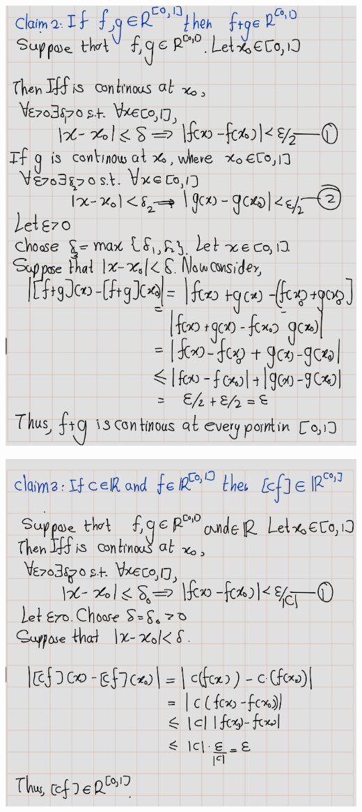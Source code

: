 \documentclass[
]{book}
\theoremstyle{definition}
\theoremstyle{definition}
\theoremstyle{definition}
\theoremstyle{definition}
\theoremstyle{remark}
\begin{document}
\includegraphics{fig/Ex1C/Ex2-3.png}

\includegraphics{fig/Ex1C/Ex2-4.png}
\end{document}
